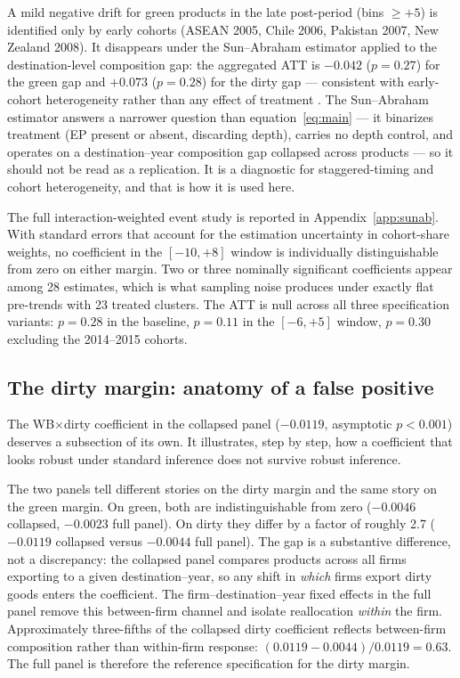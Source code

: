 \documentclass[12pt]{article}
\begin{document}
A mild negative drift for green products in the late post-period (bins $\geq +5$) is
identified only by early cohorts (ASEAN 2005, Chile 2006, Pakistan 2007, New Zealand
2008). It disappears under the Sun--Abraham estimator applied to the destination-level
composition gap: the aggregated ATT is $-0.042$ ($p = 0.27$) for the green gap and
$+0.073$ ($p = 0.28$) for the dirty gap --- consistent with early-cohort heterogeneity
rather than any effect of treatment \citep{sun2021}. The Sun--Abraham estimator answers a
narrower question than equation~\eqref{eq:main} --- it binarizes treatment (EP present or
absent, discarding depth), carries no depth control, and operates on a destination--year
composition gap collapsed across products --- so it should not be read as a replication.
It is a diagnostic for staggered-timing and cohort heterogeneity, and that is how it is
used here.

The full interaction-weighted event study is reported in Appendix~\ref{app:sunab}. With
standard errors that account for the estimation uncertainty in cohort-share
weights, no coefficient in the $[-10, +8]$ window is individually distinguishable
from zero on either margin. Two or three nominally significant coefficients appear among
28 estimates, which is what sampling noise produces under exactly flat pre-trends with 23
treated clusters. The ATT is null across all three specification variants: $p = 0.28$ in
the baseline, $p = 0.11$ in the $[-6, +5]$ window, $p = 0.30$ excluding the 2014--2015
cohorts.

\subsection{The dirty margin: anatomy of a false positive}\label{sec:dirty}

The WB$\times$dirty coefficient in the collapsed panel ($-0.0119$, asymptotic $p < 0.001$)
deserves a subsection of its own. It illustrates, step by step, how a coefficient that
looks robust under standard inference does not survive robust inference.

The two panels tell different stories on the dirty margin and the same story on the green
margin. On green, both are indistinguishable from zero ($-0.0046$ collapsed,
$-0.0023$ full panel). On dirty they differ by a factor of roughly 2.7 ($-0.0119$
collapsed versus $-0.0044$ full panel). The gap is a substantive difference, not
a discrepancy: the collapsed panel compares products across all firms exporting to a given
destination--year, so any shift in \emph{which} firms export dirty goods enters the
coefficient. The firm--destination--year fixed effects in the full panel remove this
between-firm channel and isolate reallocation \emph{within} the firm. Approximately
three-fifths of the collapsed dirty coefficient reflects between-firm composition rather
than within-firm response: $(0.0119 - 0.0044) / 0.0119 = 0.63$. The full panel is therefore the reference specification for
the dirty margin.
\end{document}
